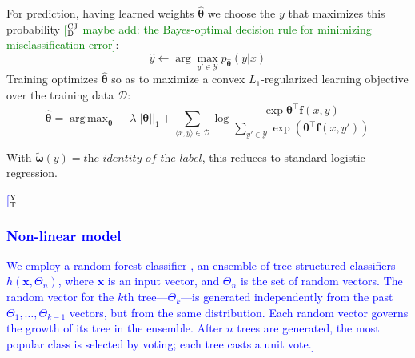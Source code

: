 \documentclass[11pt,letterpaper]{article}
\DeclareMathOperator*{\argmax}{arg\,max}
\newcommand{\ensuretext}[1]{#1}
\newcommand{\cjdmarker}{\ensuretext{\textcolor{green}{\ensuremath{^{\textsc{CJ}}_{\textsc{D}}}}}}
\newcommand{\nssmarker}{\ensuretext{\textcolor{magenta}{\ensuremath{^{\textsc{NS}}_{\textsc{S}}}}}}
\newcommand{\ytmarker}{\ensuretext{\textcolor{blue}{\ensuremath{^{\textsc{Y}}_{\textsc{T}}}}}}
\newcommand{\arkcomment}[3]{\ensuretext{\textcolor{#3}{[#1 #2]}}}
\newcommand{\cjd}[1]{\arkcomment{\cjdmarker}{#1}{green}}
\newcommand{\nss}[1]{\arkcomment{\nssmarker}{#1}{magenta}}
\newcommand{\yt}[1]{\arkcomment{\ytmarker}{#1}{blue}}
\newcommand{\costversion}[1]{}
\begin{document}
For prediction, having learned weights $\hat{\boldsymbol{\theta}}$ we choose the $y$ that maximizes this probability \cjd{maybe add: the Bayes-optimal decision rule for minimizing misclassification error}:
\begin{equation}
\hat{y} \leftarrow \arg\max_{y' \in \mathcal{Y}} p_{\hat{\boldsymbol{\theta}}}(y | x)
\end{equation}
Training optimizes $\hat{\boldsymbol{\theta}}$ so as to maximize a convex $L_1$-regularized
\costversion{\emph{softmax-margin} }learning objective\costversion{ \citep{gimpel}} over the training data $\mathcal{D}$:
\begin{equation}
\hat{\boldsymbol{\theta}} = \argmax_{\boldsymbol{\theta}} 
-\lambda ||\boldsymbol{\theta}||_1 
+ \sum_{\langle x,y \rangle\in\mathcal{D}} \log{\frac{\exp{\boldsymbol{\theta}^{\top}\mathbf{f}(x,y)}}{\sum_{y' \in \mathcal{Y}}\exp{\left(\boldsymbol{\theta}^{\top}\mathbf{f}(x,y')\costversion{ + \kappa\textit{cost}(y,y')}\right)}}}
\end{equation}
\costversion{The \emph{cost function} allows us to penalize some errors more than others during training, 
taking into account the linguistic functions of the labels.
It is zero for the gold label and nonnegative for the others.\nss{intuition}

This framework gives us several ways to design a classifier appropriate to the task: 
the attributes, the space of labels $\mathcal{Y}$ to consider, 
and the cost function, and of course, the features themselves.}
With \costversion{$\kappa = 0$, $\mathcal{Y} = \{\textit{gold labels in training}\}$, 
and }$\tilde{\boldsymbol{\omega}}(y) = \textit{the identity of the label}$, 
this reduces to standard logistic regression.

\yt{\subsubsection{Non-linear model}
We employ a random forest classifier \citep{Breiman:2001}, an ensemble of tree-structured classifiers ${h(\mathbf{x}, \Theta_n)}$, where $\mathbf{x}$ is an input vector, and ${\Theta_n}$ is the set of random vectors. The random vector for the $k$th tree---$\Theta_k$---is generated independently from the past $\Theta_1, \dots, \Theta_{k-1}$ vectors, but from the same distribution. Each random vector governs the growth of its tree in the ensemble. After $n$ trees are generated, the most popular class is selected by voting; each tree casts a unit vote.}
 
\end{document}
